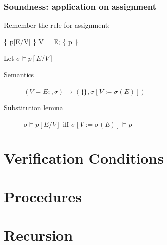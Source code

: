 \documentclass[12pt, a4paper]{book}
\begin{document}
    \subsubsection{Soundness: application on assignment}

    Remember the rule for assignment:

    \begin{center}
        \begin{minipage}{0.4\linewidth}
        \begin{framed}
            \inference{}
            { \{ p[E/V] \} V = E; \{ p \} }
        \end{framed}
        \end{minipage}
    \end{center}

    Let $\sigma \models p[E/V]$

    \begin{description}
        \item[Semantics] $(V = E; , \sigma) \longrightarrow (\{\}, \sigma[V := \sigma(E)]) $
        \item[Substitution lemma] $\sigma \models p[E/V]$ iff $\sigma[V:=\sigma(E)] \models p$
    \end{description}


  \section{Verification Conditions}
  \label{sec:Verification Conditions}
  \section{Procedures}
  \label{sec:Procedures}

  \section{Recursion}
  \label{sec:Recursion}
\end{document}
